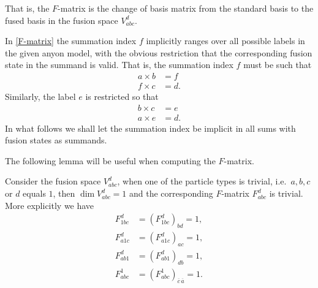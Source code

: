 That is, the $F$-matrix is the change of basis matrix from the standard basis to the fused basis in the fusion space $V_{abc}^d$.

\begin{remark}\label{rem:sum index range}
  In \cref{F-matrix} the summation index $f$ implicitly ranges over all possible labels in the given anyon model, with the obvious restriction that the corresponding fusion state in the summand is valid. That is, the summation index $f$ must be such that
  \begin{equation}
    \begin{aligned}
      a \times b &= f \\
      f \times c &= d.
    \end{aligned}
  \end{equation}
  Similarly, the label $e$ is restricted so that
  \begin{equation}
    \begin{aligned}
      b \times c &= e \\
      a \times e &= d.
    \end{aligned}
  \end{equation}
  In what follows we shall let the summation index be implicit in all sums with fusion states as summands.
\end{remark}

The following lemma will be useful when computing the $F$-matrix.

\begin{lemma}\label{res:F1}
  Consider the fusion space $V_{abc}^d$, when one of the particle types is trivial, i.e.\ $a,b,c$ or $d$ equals $1$, then $\dim V_{abc}^d = 1$ and the corresponding $F$-matrix $F_{abc}^d$ is trivial. More explicitly we have
  \begin{equation}
    \begin{aligned}
      F_{1bc}^d &= \left( F_{1bc}^d \right)_{bd} = 1, \\
      F_{a1c}^d &= \left( F_{a1c}^d \right)_{ac} = 1, \\
      F_{ab1}^d &= \left( F_{ab1}^d \right)_{db} = 1, \\
      F_{abc}^1 &= \left( F_{abc}^1 \right)_{\overline{c}\,\overline{a}} = 1.
    \end{aligned}
  \end{equation}
\end{lemma}

